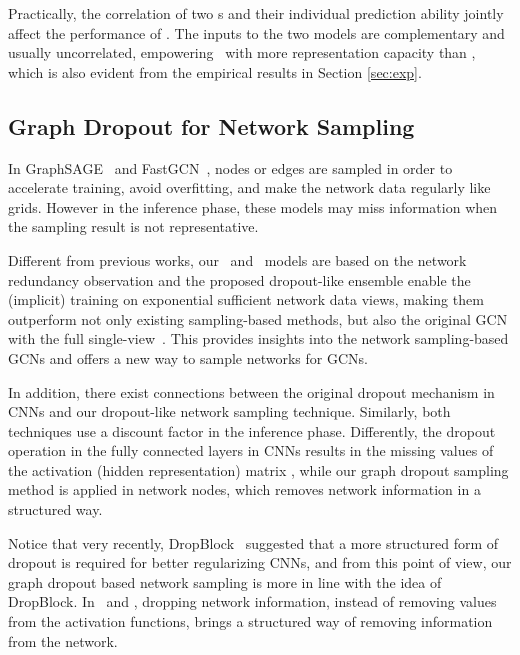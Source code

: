 {{Practically, the correlation of two \drop s and their individual prediction ability jointly affect the performance of \dm. 
The inputs to the two models are complementary  and usually uncorrelated, empowering \dm\ with more representation capacity than \drop, which is also evident from the empirical results in Section \ref{sec:exp}.  



\subsection{ Graph Dropout for Network Sampling}
In GraphSAGE~\cite{hamilton2017inductive} and FastGCN~\cite{chen2018fastgcn}, 
nodes or edges are sampled in order to accelerate training, avoid overfitting, and make the network data regularly like grids. However in the inference phase, these models may miss information when the sampling result is not representative. 

Different from previous works, our \drop\ and \dm\ models are based on the network redundancy observation and the proposed dropout-like ensemble enable the (implicit) training on exponential sufficient network data views, making them outperform not only existing sampling-based methods, but also the original GCN with the full single-view~\cite{kipf2016semi}. 
This provides 
insights into the network sampling-based GCNs and offers a new way to sample networks for GCNs.



In addition, there exist connections between the original dropout mechanism in CNNs and our dropout-like network sampling technique. 
Similarly, both techniques use a discount factor in the inference phase. 
Differently, the dropout operation in the fully connected layers in CNNs results in the missing values of the activation (hidden representation) matrix , while our graph dropout sampling method is applied in network nodes, which removes network information in a structured way. 

Notice that very recently, DropBlock~\cite{ghiasi2018dropblock} suggested that a more structured form of dropout is required for better regularizing CNNs, and from this point of view, our graph dropout based network sampling is more in line with the idea of DropBlock. In \drop\ and \dm, dropping network information, instead of removing values from the activation functions, brings a structured way of removing information from the network. 
}






}%
